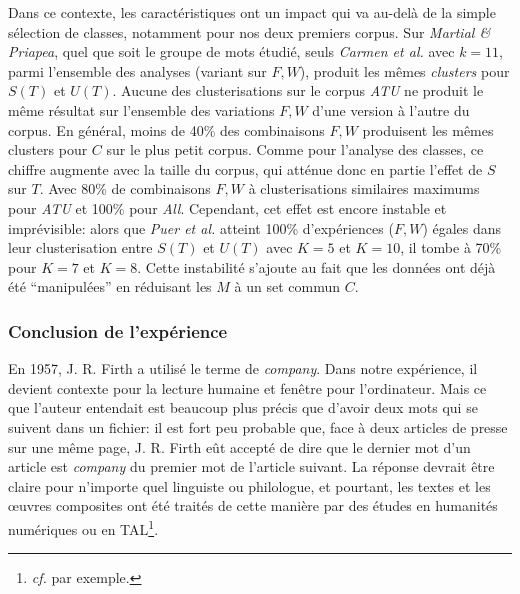 Dans ce contexte, les caractéristiques ont un impact qui va au-delà de la simple sélection de classes, notamment pour nos deux premiers corpus. Sur \textit{Martial \& Priapea}, quel que soit le groupe de mots étudié, seuls \textit{Carmen et al.} avec $k=11$, parmi l'ensemble des analyses (variant sur $F,W$), produit les mêmes \textit{clusters} pour $S(T)$ et $U(T)$. Aucune des clusterisations sur le corpus \textit{ATU} ne produit le même résultat sur l'ensemble des variations $F,W$ d'une version à l'autre du corpus. En général, moins de 40\% des combinaisons $F,W$ produisent les mêmes clusters pour $C$ sur le plus petit corpus. Comme pour l'analyse des classes, ce chiffre augmente avec la taille du corpus, qui atténue donc en partie l'effet de $S$ sur $T$. Avec 80\% de combinaisons $F,W$ à clusterisations similaires maximums pour \textit{ATU} et 100\% pour \textit{All}. Cependant, cet effet est encore instable et imprévisible: alors que \textit{Puer et al.} atteint 100\% d'expériences ($F,W$) égales dans leur clusterisation entre $S(T)$ et $U(T)$ avec $K=5$ et $K=10$, il tombe à 70\% pour $K=7$ et $K=8$. Cette instabilité s'ajoute au fait que les données ont déjà été \enquote{manipulées} en réduisant les $M$ à un set commun $C$.

\subsubsection{Conclusion de l'expérience}


En 1957, J. R. Firth a utilisé le terme de \textit{company}. Dans notre expérience, il devient contexte pour la lecture humaine et fenêtre pour l'ordinateur. Mais ce que l'auteur entendait est beaucoup plus précis que d'avoir deux mots qui se suivent dans un fichier: il est fort peu probable que, face à deux articles de presse sur une même page, J. R. Firth eût accepté de dire que le dernier mot d'un article est \textit{company} du premier mot de l'article suivant. La réponse devrait être claire pour n'importe quel linguiste ou philologue, et pourtant, les textes et les œuvres composites ont été traités de cette manière par des études en humanités numériques ou en TAL\footnote{\textit{cf.} \textcite{kontges_measuring_2020} par exemple.}. 

